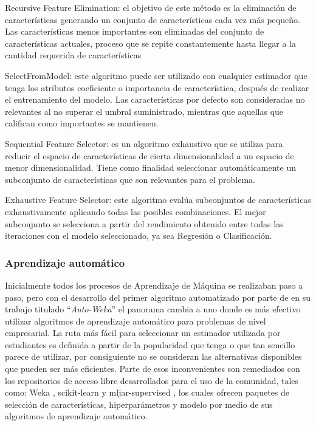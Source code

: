  \begin{APAitemize}
     \item Recursive Feature Elimination: el objetivo de este método es la eliminación de características generando un conjunto de características cada vez más pequeño. Las características menos importantes son eliminadas del conjunto de características actuales, proceso que se repite constantemente hasta llegar a la cantidad requerida de características
     \item SelectFromModel: este algoritmo puede ser utilizado con cualquier estimador que tenga los atributos coeficiente o importancia de característica, después de realizar el entrenamiento del modelo. Las características por defecto son consideradas no relevantes al no superar el umbral suministrado, mientras que aquellas que califican como importantes se mantienen.
     \item Sequential Feature Selector: es un algoritmo exhaustivo que se utiliza para reducir el espacio de características de cierta dimensionalidad a un espacio de menor dimensionalidad. Tiene como finalidad seleccionar automáticamente un subconjunto de características que son relevantes para el problema. 
     \item Exhaustive Feature Selector: este algoritmo evalúa subconjuntos de características exhaustivamente aplicando todas las posibles combinaciones. El mejor subconjunto se selecciona a partir del rendimiento obtenido entre todas las iteraciones con el modelo seleccionado, ya sea Regresión o Clasificación.
 \end{APAitemize}
 
\subsubsection{Aprendizaje automático}
Inicialmente todos los procesos de Aprendizaje de Máquina se realizaban paso a paso, pero con el desarrollo del primer algoritmo automatizado por parte de \textcite{Thornton2013} en su trabajo titulado ``\textit{Auto-Weka}'' el panorama cambia a uno donde es más efectivo utilizar algoritmos de aprendizaje automático para problemas de nivel empresarial. La ruta más fácil para seleccionar un estimador utilizada por estudiantes es definida a partir de la popularidad que tenga o que tan sencillo parece de utilizar, por consiguiente no se consideran las alternativas disponibles que pueden ser más eficientes. Parte de esos inconvenientes son remediados con los repositorios de acceso libre desarrollados para el uso de la comunidad, tales como: Weka \parencite{Hall2009}, scikit-learn \parencite{scikit-learn} y mljar-supervised \parencite{mljar2018}, los cuales ofrecen paquetes de selección de características, hiperparámetros y modelo por medio de sus algoritmos de aprendizaje automático.

